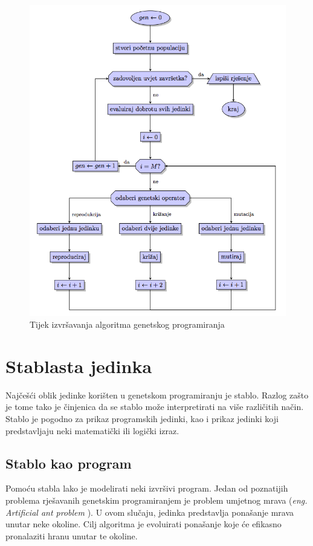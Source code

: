 \begin{figure}[H]
	\centering
	\includegraphics[scale=0.6]{./slike/blokDijagram.png}
	\caption{Tijek izvršavanja algoritma genetskog programiranja}
	\label{tijek}
\end{figure}

\section{Stablasta jedinka}
Najčešći oblik jedinke korišten u genetskom programiranju je stablo. Razlog zašto je tome tako je činjenica da se stablo može interpretirati na više različitih način. Stablo je pogodno za prikaz programskih jedinki, kao i prikaz jedinki koji predstavljaju neki matematički ili logički izraz.


\subsection{Stablo kao program}
Pomoću stabla lako je modelirati neki izvršivi program. Jedan od poznatijih problema rješavanih genetskim programiranjem je problem umjetnog mrava (\textit{eng. Artificial ant problem} \cite{koza}). U ovom slučaju, jedinka predstavlja ponašanje mrava unutar neke okoline. Cilj algoritma je evoluirati ponašanje koje će efikasno pronalaziti hranu unutar te okoline.

